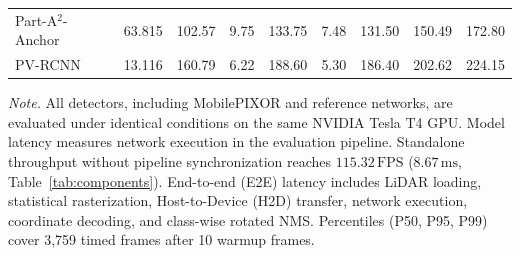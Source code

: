 \begin{table}[t]
\begin{tabular}{@{}lrrrrrrrr@{}}
Part-A$^2$-Anchor~\cite{shi2020part} & 63.815 & 102.57 & 9.75 & 133.75 & 7.48 & 131.50 & 150.49 & 172.80 \\
PV-RCNN~\cite{shi2020pvrcnn} & 13.116 & 160.79 & 6.22 & 188.60 & 5.30 & 186.40 & 202.62 & 224.15 \\
\bottomrule
\end{tabular}
\par\vspace{2pt}
{\footnotesize \textit{Note.} All detectors, including MobilePIXOR and reference networks, are evaluated under identical conditions on the same NVIDIA Tesla T4 GPU. Model latency measures network execution in the evaluation pipeline. Standalone throughput without pipeline synchronization reaches $115.32\,\text{FPS}$ ($8.67\,\text{ms}$, Table~\ref{tab:components}). End-to-end (E2E) latency includes LiDAR loading, statistical rasterization, Host-to-Device (H2D) transfer, network execution, coordinate decoding, and class-wise rotated NMS. Percentiles (P50, P95, P99) cover 3,759 timed frames after 10 warmup frames.}
\end{table}
